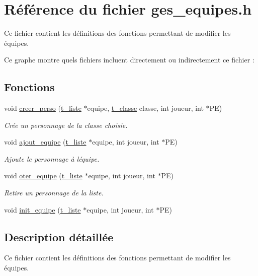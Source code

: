 \hypertarget{a00017}{}\section{Référence du fichier ges\+\_\+equipes.\+h}
\label{a00017}


Ce fichier contient les définitions des fonctions permettant de modifier les équipes.  


Ce graphe montre quels fichiers incluent directement ou indirectement ce fichier \+:
\subsection*{Fonctions}
\begin{DoxyCompactItemize}
\item 
void \hyperlink{a00017_a81881c560de70e7f41649ddefb5efd12}{creer\+\_\+perso} (\hyperlink{a00005}{t\+\_\+liste} $\ast$equipe, \hyperlink{a00003}{t\+\_\+classe} classe, int joueur, int $\ast$PE)
\begin{DoxyCompactList}\small\item\em Crée un personnage de la classe choisie. \end{DoxyCompactList}\item 
void \hyperlink{a00017_a994d5645dd5285703f220c21eb38c849}{ajout\+\_\+equipe} (\hyperlink{a00005}{t\+\_\+liste} $\ast$equipe, int joueur, int $\ast$PE)
\begin{DoxyCompactList}\small\item\em Ajoute le personnage à l\textquotesingle{}équipe. \end{DoxyCompactList}\item 
void \hyperlink{a00017_a3fc9764c1f5a4c86bc574439f9092689}{oter\+\_\+equipe} (\hyperlink{a00005}{t\+\_\+liste} $\ast$equipe, int joueur, int $\ast$PE)
\begin{DoxyCompactList}\small\item\em Retire un personnage de la liste. \end{DoxyCompactList}\item 
void \hyperlink{a00017_a13288c98091fa36fe74b412dee64918f}{init\+\_\+equipe} (\hyperlink{a00005}{t\+\_\+liste} $\ast$equipe, int joueur, int $\ast$PE)
\end{DoxyCompactItemize}


\subsection{Description détaillée}
Ce fichier contient les définitions des fonctions permettant de modifier les équipes. 

